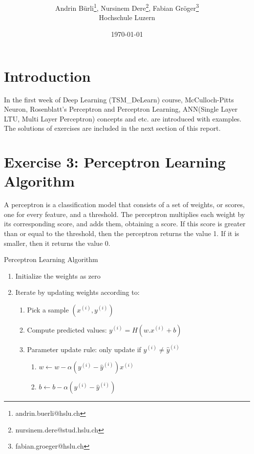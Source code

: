 \documentclass[onecolumn]{article}
\title{\spacecaps{Lab report: SW01 }\\ \normalsize \spacesc{TSM\_DeLearn} }
\author{Andrin Bürli\thanks{andrin.buerli@hslu.ch}, Nursinem Dere\thanks{nursinem.dere@stud.hslu.ch}, Fabian Gröger\thanks{fabian.groeger@hslu.ch}\\Hochschule Luzern}
\date{\today}
\begin{document}
\maketitle





\section{Introduction}

In the first week of Deep Learning (TSM\_DeLearn) course, McCulloch-Pitts Neuron, Rosenblatt's Perceptron and Perceptron Learning, ANN(Single Layer LTU, Multi Layer Perceptron) concepts and etc. are introduced with examples. The solutions of exercises are included in the next section of this report.

\section{Exercise 3: Perceptron Learning Algorithm}

A perceptron is a classification model that consists of a set of weights, or scores, one for every feature, and a threshold. The perceptron multiplies each weight by its corresponding score, and adds them, obtaining a score. If this score is greater than or equal to the threshold, then the perceptron returns the value 1. If it is smaller, then it returns the value 0.

\begin{algorithm}[H] 
	\caption{Perceptron Learning Algorithm}
	\begin{enumerate}
		\item
		Initialize the weights as zero
		\item
		Iterate by updating weights according to:
		\begin{enumerate}
			\item
			Pick a sample $(x^{(i)}, y^{(i)})$
			\item
			Compute predicted values: $y^{(i)} = H(w.x^{(i)}+b)$
			\item
			Parameter update rule: only update if $y^{(i)} \neq  \hat{y}^{(i)}$
			\begin{enumerate}
				\item
				$w \leftarrow w - \alpha (y^{(i)} - \hat{y}^{(i)})x^{(i)}$
				\item
				$b \leftarrow b - \alpha (y^{(i)} - \hat{y}^{(i)})$
			\end{enumerate}
		\end{enumerate}
		
	\end{enumerate}
\end{algorithm}
\end{document}
